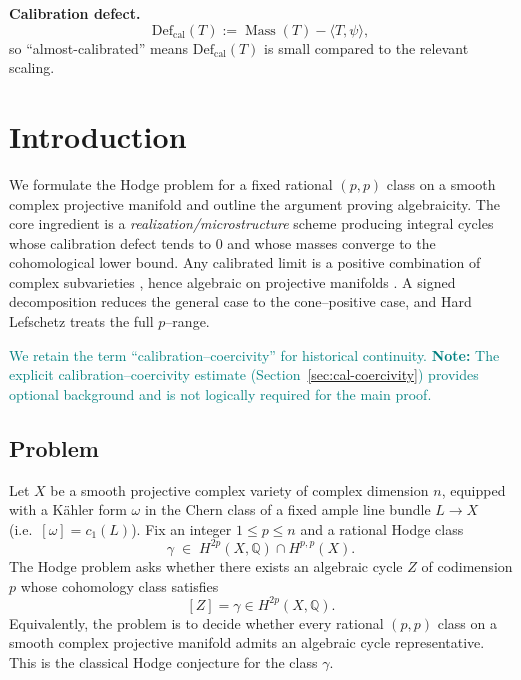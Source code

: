 \documentclass[11pt]{article}
\newcommand{\REVMZ}[1]{\textcolor{teal}{#1}}  %
\numberwithin{equation}{section}  %
\theoremstyle{plain}
\theoremstyle{definition}
\theoremstyle{remark}
\newcommand{\Q}{\mathbb{Q}}
\DeclareMathOperator{\Mass}{Mass}
\newcommand{\Def}{\mathrm{Def}}
\begin{document}
\noindent\textbf{Calibration defect.}
\[
\Def_{\mathrm{cal}}(T):=\Mass(T)-\langle T,\psi\rangle,
\]
so ``almost-calibrated'' means $\Def_{\mathrm{cal}}(T)$ is small compared to the relevant scaling.




	\section{Introduction}

We formulate the Hodge problem for a fixed rational $(p,p)$ class on a smooth complex projective manifold and outline the argument proving algebraicity.
The core ingredient is a \emph{realization/microstructure} scheme producing integral cycles whose calibration defect tends to $0$ and whose masses converge to the cohomological lower bound.
Any calibrated limit is a positive combination of complex subvarieties \REVMZ{\cite{King71,HL82}}, hence algebraic on projective manifolds \REVMZ{\cite{Chow49,Serre56}}.
A signed decomposition reduces the general case to the cone--positive case, and Hard Lefschetz \REVMZ{\cite{Voisin02,GH78}} treats the full $p$--range.

\REVMZ{We retain the term ``calibration--coercivity'' for historical continuity. \textbf{Note:} The explicit calibration--coercivity estimate (Section~\ref{sec:cal-coercivity}) provides optional background and is not logically required for the main proof.}



\vspace{0.3cm}

\subsection*{Problem}

Let $X$ be a smooth projective complex variety of complex dimension $n$,
equipped with a K\"ahler form $\omega$ in the Chern class of a fixed ample line bundle $L\to X$ (i.e.\ $[\omega]=c_1(L)$).  Fix an integer $1 \leq p \leq n$ and a
rational Hodge class
\[
\gamma \;\in\; H^{2p}(X,\Q) \cap H^{p,p}(X).
\]
The Hodge problem asks whether there exists an algebraic cycle $Z$ of
codimension $p$ whose cohomology class satisfies
\[
[Z] = \gamma \in H^{2p}(X,\Q).
\]
Equivalently, the problem is to decide whether every rational $(p,p)$ class on a
smooth complex projective manifold admits an algebraic cycle representative.
This is the classical Hodge conjecture for the class $\gamma$.
\end{document}

